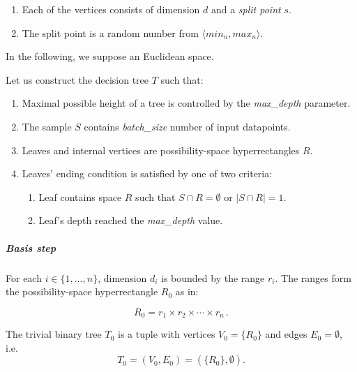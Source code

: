\begin{enumerate}
    \item Each of the vertices consists of dimension $d$ and a \textit{split point} $s$.
    \item The split point is a random number from $\langle min_n, max_n \rangle$.
\end{enumerate}

In the following, we suppose an Euclidean space.

Let us construct the decision tree $T$ such that:

\begin{enumerate}
    \item Maximal possible height of a tree is controlled by the \emph{max\_depth} parameter.
    \item The sample \(S\) contains \emph{batch\_size} number of input datapoints.
    \item Leaves and internal vertices are possibility-space hyperrectangles \(R\). 
    \item Leaves' ending condition is satisfied by one of two criteria: 
\begin{enumerate}
    \item Leaf contains space \(R\) such that \(S \cap R = \emptyset\) or \(| S \cap R | = 1\).
    \item Leaf's depth reached the \emph{max\_depth} value.
\end{enumerate}
\end{enumerate}


\subparagraph{Basis step}

For each \(i \in\{1, \dots, n\}\), dimension \(d_i\) is bounded by the range \(r_i\). The ranges form the possibility-space hyperrectangle \(R_0\) as in:

\[R_0 =  r_1 \times r_2 \times \cdots \times r_n  \tag{xx}\,.\]

The trivial binary tree \(T_0\) is a tuple with
vertices \(V_0 = \{R_0\}\) and edges \(E_0 = \emptyset\), i.e.
\[T_0= (V_0, E_0) = (\{R_0\},\emptyset).\]
